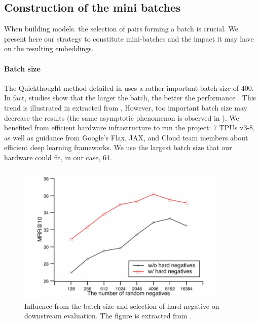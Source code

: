\subsection{Construction of the mini batches}

When building models. the selection of pairs forming a batch is crucial. We present here our strategy to constitute mini-batches and the impact it may have on the resulting embeddings.

\paragraph{Batch size} The Quickthought method detailed in  uses a rather important batch size of 400. In fact, studies show that the larger the batch, the better the performance \parencite{chen_20a, qu_21}. This trend is illustrated in  extracted from \textcite{qu_21}. However, too important batch size may decrease the results (the same asymptotic phenomenon is observed in \textcite{chen_20a}). We benefited from efficient hardware infrastructure to run the project: 7 TPUs v3-8, as well as guidance from Google’s Flax, JAX, and Cloud team members about efficient deep learning frameworks. We use the largest batch size that our hardware could fit, in our case, 64.

\begin{figure}[htb!]
	\includegraphics[width=10cm]{images/batch-size.png}
	\caption[Batch size]{Influence from the batch size and selection of hard negative on downstream evaluation. The figure is extracted from \textcite{qu_21}.}
\end{figure}


